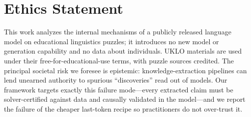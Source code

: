 \section*{Ethics Statement}
\label{sec:ethics}

This work analyzes the internal mechanisms of a publicly released language
model on educational linguistics puzzles; it introduces no new model or
generation capability and no data about individuals. UKLO materials are
used under their free-for-educational-use terms, with puzzle sources
credited. The principal societal risk we foresee is epistemic:
knowledge-extraction pipelines can lend unearned authority to spurious
``discoveries'' read out of models. Our framework targets exactly this
failure mode---every extracted claim must be solver-certified against data
and causally validated in the model---and we report the failure of the
cheaper last-token recipe so practitioners do not over-trust it.
